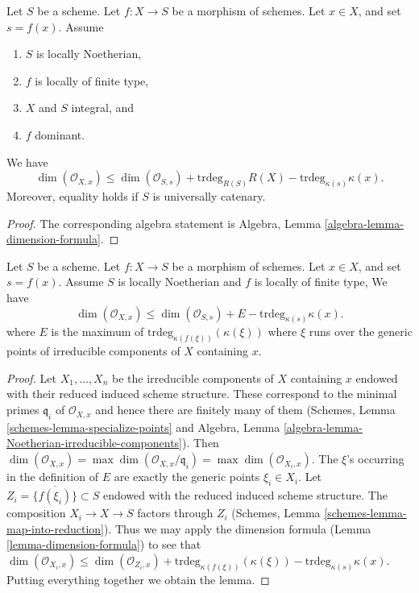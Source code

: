 \begin{lemma}
\label{lemma-dimension-formula}
Let $S$ be a scheme.
Let $f : X \to S$ be a morphism of schemes.
Let $x \in X$, and set $s = f(x)$.
Assume
\begin{enumerate}
\item $S$ is locally Noetherian,
\item $f$ is locally of finite type,
\item $X$ and $S$ integral, and
\item $f$ dominant.
\end{enumerate}
We have
\begin{equation}
\label{equation-dimension-formula}
\dim(\mathcal{O}_{X, x})
\leq
\dim(\mathcal{O}_{S, s}) + \text{trdeg}_{R(S)}R(X)
- \text{trdeg}_{\kappa(s)} \kappa(x).
\end{equation}
Moreover, equality holds if $S$ is universally catenary.
\end{lemma}

\begin{proof}
The corresponding algebra statement is
Algebra, Lemma \ref{algebra-lemma-dimension-formula}.
\end{proof}

\begin{lemma}
\label{lemma-dimension-formula-general}
Let $S$ be a scheme. Let $f : X \to S$ be a morphism of schemes.
Let $x \in X$, and set $s = f(x)$. Assume $S$ is locally Noetherian
and $f$ is locally of finite type,
We have
\begin{equation}
\label{equation-dimension-formula-general}
\dim(\mathcal{O}_{X, x})
\leq
\dim(\mathcal{O}_{S, s}) + E - \text{trdeg}_{\kappa(s)} \kappa(x).
\end{equation}
where $E$ is the maximum of $\text{trdeg}_{\kappa(f(\xi))}(\kappa(\xi))$
where $\xi$ runs over the generic points of irreducible components
of $X$ containing $x$.
\end{lemma}

\begin{proof}
Let $X_1, \ldots, X_n$ be the irreducible components of $X$ containing $x$
endowed with their reduced induced scheme structure.
These correspond to the minimal primes $\mathfrak q_i$ of
$\mathcal{O}_{X, x}$ and hence there are finitely many of them
(Schemes, Lemma \ref{schemes-lemma-specialize-points} and
Algebra, Lemma \ref{algebra-lemma-Noetherian-irreducible-components}).
Then
$\dim(\mathcal{O}_{X, x}) = \max \dim(\mathcal{O}_{X, x}/\mathfrak q_i)
= \max \dim(\mathcal{O}_{X_i, x})$.
The $\xi$'s occurring in the definition of $E$ are exactly the
generic points $\xi_i \in X_i$. Let $Z_i = \overline{\{f(\xi_i)\}} \subset S$
endowed with the reduced induced scheme structure.
The composition $X_i \to X \to S$ factors through $Z_i$
(Schemes, Lemma \ref{schemes-lemma-map-into-reduction}). Thus we may apply
the dimension formula (Lemma \ref{lemma-dimension-formula})
to see that
$\dim(\mathcal{O}_{X_i, x}) \leq \dim(\mathcal{O}_{Z_i, x}) +
\text{trdeg}_{\kappa(f(\xi))}(\kappa(\xi)) -
\text{trdeg}_{\kappa(s)} \kappa(x)$. Putting everything together
we obtain the lemma.
\end{proof}

